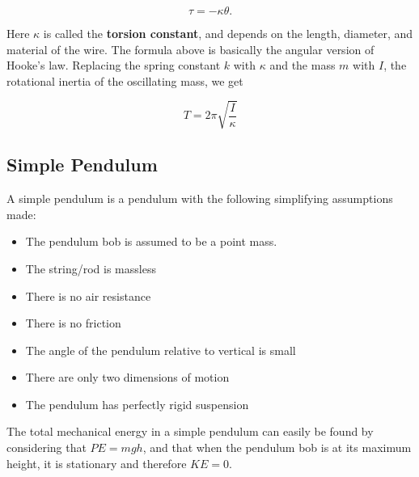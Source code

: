 \documentclass{article}
\begin{document}
\[ \tau = - \kappa \theta. \]

Here $\kappa$ is called the \textbf{torsion constant}, and depends on the length, diameter, and material of the wire. The formula above is basically the angular version of Hooke's law. Replacing the spring constant $k$ with $\kappa$ and the mass $m$ with $I$, the rotational inertia of the oscillating mass, we get

\[ T = 2 \pi \sqrt{\frac{I}{\kappa}} \]

\subsection{Simple Pendulum}

A simple pendulum is a pendulum with the following simplifying assumptions made:

\begin{itemize}
\item The pendulum bob is assumed to be a point mass.
\end{itemize}

\begin{itemize}
\item The string/rod is massless
\end{itemize}

\begin{itemize}
\item There is no air resistance
\end{itemize}

\begin{itemize}
\item There is no friction
\end{itemize}

\begin{itemize}
\item The angle of the pendulum relative to vertical is small
\end{itemize}

\begin{itemize}
\item There are only two dimensions of motion
\end{itemize}

\begin{itemize}
\item The pendulum has perfectly rigid suspension
\end{itemize}

The total mechanical energy in a simple pendulum can easily be found by considering that $PE = mgh$, and that when the pendulum bob is at its maximum height, it is stationary and therefore $KE = 0$.
\end{document}
